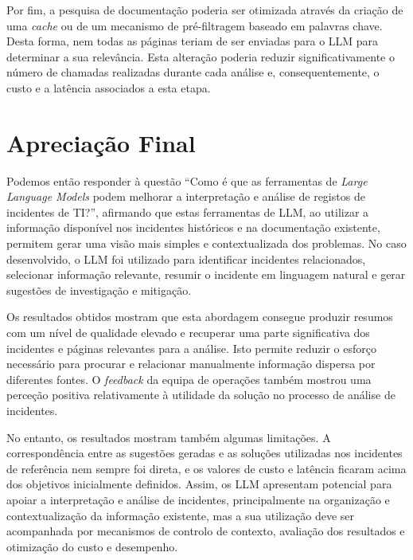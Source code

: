 	Por fim, a pesquisa de documentação poderia ser otimizada através da criação de uma \textit{cache} ou de um mecanismo de pré-filtragem baseado em palavras chave. Desta forma, nem todas as páginas teriam de ser enviadas para o \gls{LLM} para determinar a sua relevância. Esta alteração poderia reduzir significativamente o número de chamadas realizadas durante cada análise e, consequentemente, o custo e a latência associados a esta etapa.

\section{Apreciação Final}
	
	Podemos então responder à questão “Como é que as ferramentas de \textit{Large Language Models} podem melhorar a interpretação e análise de registos de incidentes de TI?”, afirmando que estas ferramentas de \gls{LLM}, ao utilizar a informação disponível nos incidentes históricos e na documentação existente, permitem gerar uma visão mais simples e contextualizada dos problemas. No caso desenvolvido, o \gls{LLM} foi utilizado para identificar incidentes relacionados, selecionar informação relevante, resumir o incidente em linguagem natural e gerar sugestões de investigação e mitigação.
	
	Os resultados obtidos mostram que esta abordagem consegue produzir resumos com um nível de qualidade elevado e recuperar uma parte significativa dos incidentes e páginas relevantes para a análise. Isto permite reduzir o esforço necessário para procurar e relacionar manualmente informação dispersa por diferentes fontes. O \textit{feedback} da equipa de operações também mostrou uma perceção positiva relativamente à utilidade da solução no processo de análise de incidentes.
	
	No entanto, os resultados mostram também algumas limitações. A correspondência entre as sugestões geradas e as soluções utilizadas nos incidentes de referência nem sempre foi direta, e os valores de custo e latência ficaram acima dos objetivos inicialmente definidos. Assim, os \gls{LLM} apresentam potencial para apoiar a interpretação e análise de incidentes, principalmente na organização e contextualização da informação existente, mas a sua utilização deve ser acompanhada por mecanismos de controlo de contexto, avaliação dos resultados e otimização do custo e desempenho.
	